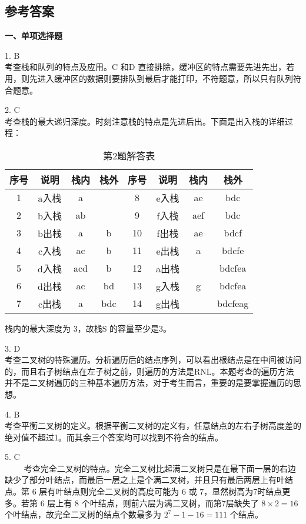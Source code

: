 \subsection{参考答案}
\textbf{一、单项选择题}

1. B \\
考查栈和队列的特点及应用。C 和D 直接排除，缓冲区的特点需要先进先出，若用，则先进入缓冲区的数据则要排队到最后才能打印，不符题意，所以只有队列符合题意。

2. C \\
考查栈的最大递归深度。时刻注意栈的特点是先进后出。下面是出入栈的详细过程：
\begin{table}[ht]
\centering
\caption{第2题解答表}\label{CSN09_tab5}
\begin{tabular}{|c|c|c|c|c|c|c|c|}
\hline
序号 & 说明 & 栈内 & 栈外 & 序号 & 说明 & 栈内 & 栈外 \\
\hline
1 & a入栈 & a & & 8 & e入栈 & ae & bdc \\
\hline
2 & b入栈 & ab & & 9 & f入栈 & aef & bdc \\
\hline
3 & b出栈 & a & b & 10 & f出栈 & ae & bdcf \\
\hline
4 & c入栈 & ac & b & 11 & e出栈 & a & bdcfe \\
\hline
5 & d入栈 & acd & b & 12 & a出栈 & & bdcfea \\
\hline
6 & d出栈 & ac & bd & 13 & g入栈 & g & bdcfea \\
\hline
7 & c出栈 & a & bdc & 14 & g出栈 & & bdcfeag \\
\hline
\end{tabular}
\end{table}
栈内的最大深度为 3，故栈S 的容量至少是3。

3. D \\
考查二叉树的特殊遍历。分析遍历后的结点序列，可以看出根结点是在中间被访问的，而且右子树结点在左子树之前，则遍历的方法是RNL。本题考查的遍历方法并不是二叉树遍历的三种基本遍历方法，对于考生而言，重要的是要掌握遍历的思想。

4. B \\
考查平衡二叉树的定义。根据平衡二叉树的定义有，任意结点的左右子树高度差的绝对值不超过1。而其余三个答案均可以找到不符合的结点。

5. C \\
$\qquad$ 考查完全二叉树的特点。完全二叉树比起满二叉树只是在最下面一层的右边缺少了部分叶结点，而最后一层之上是个满二叉树，并且只有最后两层上有叶结点。第 $6$ 层有叶结点则完全二叉树的高度可能为 $6$ 或 $7$，显然树高为7时结点更多。若第 $6$ 层上有 $8$ 个叶结点，则前六层为满二叉树，而第7层缺失了 $8\times2=16$ 个叶结点，故完全二叉树的结点个数最多为 $2^7-1-16=111$ 个结点。

